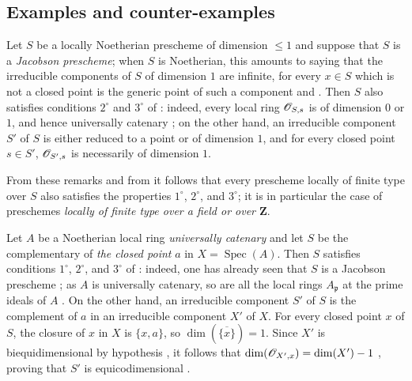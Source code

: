 \subsection{Examples and counter-examples}
\label{subsection:IV.10.7}

\begin{env}[10.7.1]
\label{IV.10.7.1}
Let $S$ be a locally Noetherian prescheme of dimension $\leq 1$ and suppose that $S$ is a \emph{Jacobson prescheme}; when $S$ is Noetherian, this amounts to saying that the irreducible components of $S$ of dimension $1$ are infinite, for every $x\in S$ which is not a closed point is the generic point of such a component  and .
Then $S$ also satisfies conditions $2^\circ$ and $3^\circ$ of : indeed, every local ring $\mathscr{O}_{S,s}$ is of dimension $0$ or $1$, and hence universally catenary ; on the other hand, an irreducible component $S'$ of $S$ is either reduced
to a point or of dimension $1$, and for every closed point $s\in S'$, $\mathscr{O}_{S',s}$ is necessarily of dimension $1$.

From these remarks and from  it follows that every prescheme locally of finite type over $S$ also satisfies the properties $1^\circ$, $2^\circ$, and $3^\circ$; it is in particular the case of preschemes \emph{locally of finite type over a field or over $\mathbf{Z}$}.
\end{env}

\begin{env}[10.7.2]
\label{IV.10.7.2}
Let $A$ be a Noetherian local ring \emph{universally catenary} and let $S$ be the complementary of \emph{the closed point} $a$ in $X=\operatorname{Spec}(A)$.
Then $S$ satisfies conditions $1^\circ$, $2^\circ$, and $3^\circ$ of : indeed, one has already seen that $S$ is a Jacobson prescheme ; as $A$ is universally catenary, so are all the local rings $A_\mathfrak{p}$ at the prime ideals of $A$ .
On the other hand, an irreducible component $S'$ of $S$ is the complement of $a$ in an irreducible component $X'$ of $X$. For every closed point $x$ of $S$, the closure of $x$ in $X$ is $\{x,a\}$, so $\dim(\overline{\{x\}})=1$. Since $X'$ is biequidimensional by hypothesis , it follows that $\dim(\mathscr{O}_{X',x})=\dim(X')-1$ , proving that $S'$ is equicodimensional .
\end{env}

